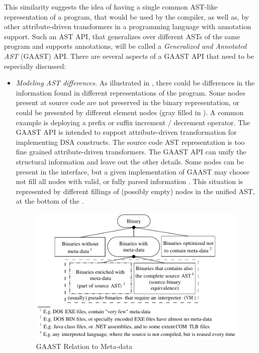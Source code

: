 This similarity suggests the idea of having a single common AST-like representation of a program, that would be used by the compiler, as well as, by other attribute-driven transformers in a programming language with annotation support. Such an AST API, that generalizes over different ASTs of the same program and supports annotations, will be called a \textit{Generalized and Annotated AST} (GAAST) API. There are several aspects of a GAAST API that need to be especially discussed:

\begin{itemize}
\item \textit{Modeling AST differences.} As illustrated in , there could be differences in the information found in different representations of the program. Some nodes present at source code are not preserved in the binary representation, or could be presented by different element nodes (gray filled in ). A common example is deploying a prefix or suffix increment / decrement operator. The GAAST API is intended to support attribute-driven transformation for implementing DSA constructs. The source code AST representation is too fine grained attribute-driven transformers. The GAAST API can unify the structural information and leave out the other details. Some nodes can be present in the interface, but a given implementation of GAAST may choose not fill all nodes with valid, or fully parsed information . This situation is represented by different fillings of (possibly empty) nodes in the unified AST, at the bottom of the .

\begin{figure}[ht]
	\begin{center}
		\includegraphics[width=12cm,height=!]{ch03/metadata}
	\end{center}
	\caption{GAAST Relation to Meta-data}
	\label{fig.meta-data}
\end{figure}


\end{itemize}
